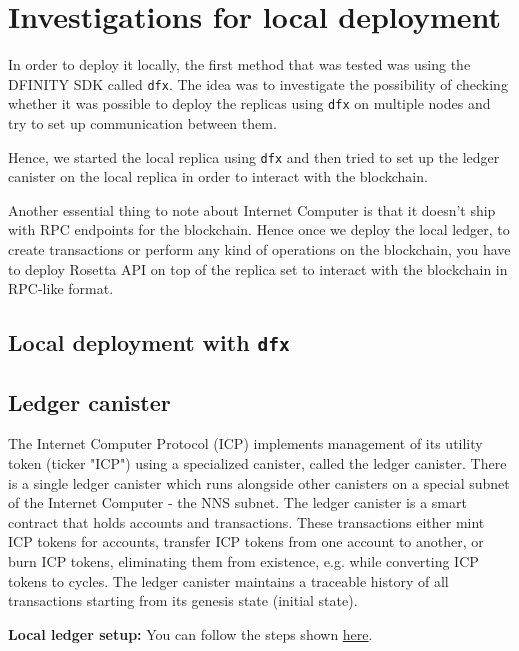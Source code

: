 \chapter{Investigations for local deployment}
\label{chap:chapterthree}

In order to deploy it locally, the first method that was tested was using the DFINITY SDK called \texttt{dfx}. The idea was to investigate the possibility of checking whether it was possible to deploy the replicas using \texttt{dfx} on multiple nodes and try to set up communication between them.

Hence, we started the local replica using \texttt{dfx} and then tried to set up the ledger canister on the local replica in order to interact with the blockchain.

Another essential thing to note about Internet Computer is that it doesn't ship with RPC endpoints for the blockchain. Hence once we deploy the local ledger, to create transactions or perform any kind of operations on the blockchain, you have to deploy Rosetta API on top of the replica set to interact with the blockchain in RPC-like format.

\section{Local deployment with \texttt{dfx}}

\section{Ledger canister}

The Internet Computer Protocol (ICP) implements management of its utility token (ticker "ICP") using a specialized canister, called the ledger canister. There is a single ledger canister which runs alongside other canisters on a special subnet of the Internet Computer - the NNS subnet. The ledger canister is a smart contract that holds accounts and transactions. These transactions either mint ICP tokens for accounts, transfer ICP tokens from one account to another, or burn ICP tokens, eliminating them from existence, e.g. while converting ICP tokens to cycles. The ledger canister maintains a traceable history of all transactions starting from its genesis state (initial state).

\textbf{Local ledger setup:} You can follow the steps shown \href{https://internetcomputer.org/docs/current/developer-docs/integrations/ledger/ledger-local-setup}{here}.

